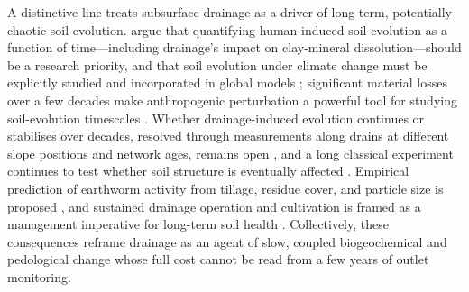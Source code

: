 A distinctive line treats subsurface drainage as a driver of long-term,
potentially chaotic soil evolution. \textcite{Montagne2009} argue that
quantifying human-induced soil evolution as a function of time---including
drainage's impact on clay-mineral dissolution---should be a research priority,
and that soil evolution under climate change must be explicitly studied and
incorporated in global models \parencite{Montagne2010}; significant material
losses over a few decades make anthropogenic perturbation a powerful tool for
studying soil-evolution timescales \parencite{Montagne2013}. Whether
drainage-induced evolution continues or stabilises over decades, resolved through
measurements along drains at different slope positions and network ages, remains
open \parencite{Frison2009}, and a long classical experiment continues to test
whether soil structure is eventually affected \parencite{HOOGHOUDT1952}.
Empirical prediction of earthworm activity from tillage, residue cover, and
particle size is proposed \parencite{Ouellet2008}, and sustained drainage
operation and cultivation is framed as a management imperative for long-term soil
health \parencite{Singh2007}. Collectively, these consequences reframe drainage
as an agent of slow, coupled biogeochemical and pedological change whose full
cost cannot be read from a few years of outlet monitoring.